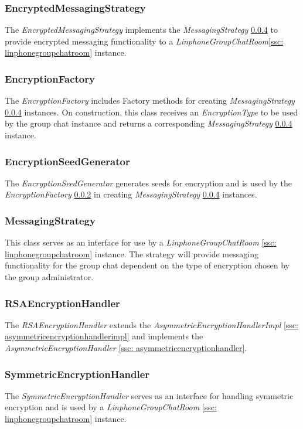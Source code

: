 \documentclass[11pt]{article}
\begin{document}
\subsubsection{EncryptedMessagingStrategy}\label{encryptedmessaginstrategy}
The \textit{EncryptedMessagingStrategy} implements the \textit{MessagingStrategy} \ref{ssc: messagingstrategy} to provide encrypted messaging functionality to a \textit{LinphoneGroupChatRoom}\ref{ssc: linphonegroupchatroom} instance.
\subsubsection{EncryptionFactory}\label{ssc: encryptionfactory}
The \textit{EncryptionFactory} includes Factory methods for creating \textit{MessagingStrategy} \ref{ssc: messagingstrategy} instances. On construction, this class receives an \textit{EncryptionType} to be used by the group chat instance and returns a corresponding \textit{MessagingStrategy} \ref{ssc: messagingstrategy} instance.
\subsubsection{EncryptionSeedGenerator}\label{ssc: encryptionseedgenerator}
The \textit{EncryptionSeedGenerator} generates seeds for encryption and is used by the \textit{EncryptionFactory} \ref{ssc: encryptionfactory} in creating \textit{MessagingStrategy} \ref{ssc: messagingstrategy} instances.
\subsubsection{MessagingStrategy}\label{ssc: messagingstrategy}
This class serves as an interface for use by a \textit{LinphoneGroupChatRoom} \ref{ssc: linphonegroupchatroom}  instance. The strategy will provide messaging functionality for the group chat dependent on the type of encryption chosen by the group administrator.
\subsubsection{RSAEncryptionHandler}\label{ssc: rsaencryptionhandler}
The \textit{RSAEncryptionHandler} extends the \textit{AsymmetricEncryptionHandlerImpl} \ref{ssc: asymmetricencryptionhandlerimpl}  and implements the \textit{AsymmetricEncryptionHandler} \ref{ssc: asymmetricencryptionhandler}.
\subsubsection{SymmetricEncryptionHandler}\label{ssc: symmetricencryptionhandler}
The \textit{SymmetricEncryptionHandler} serves as an interface for handling symmetric encryption and is used by a \textit{LinphoneGroupChatRoom} \ref{ssc: linphonegroupchatroom} instance.
\end{document}
